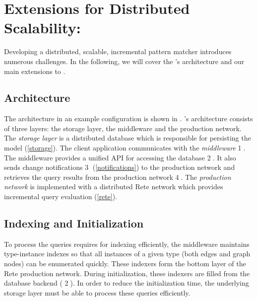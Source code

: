 

\section{Extensions for Distributed Scalability: \iqd{}}
\label{iqd-architecture}

Developing a distributed, scalable, incremental pattern matcher introduces numerous challenges. In the following, we will cover the \iqd{}'s architecture and our main extensions to \eiq{}.


\subsection{Architecture}

The \iqd{} architecture in an example configuration is shown in . \iqd{}'s architecture consists of three layers: the storage layer, the middleware and the production network. 
The \emph{storage layer} is a distributed database which is responsible for persisting the model (\autoref{storage}). 
The client application communicates with the \emph{middleware} \textcircled{1}. The middleware provides a unified API for accessing the database \textcircled{2}. It also sends change notifications \textcircled{3} (\autoref{notifications}) to the production network and retrieves the query results from the production network \textcircled{4}. 
The \emph{production network} is implemented with a distributed Rete network which provides incremental query evaluation (\autoref{rete}).

\subsection{Indexing and Initialization}
\label{indexing}

To process the queries requires for indexing efficiently, the \iqd{} middleware maintains type-instance indexes so that all instances of a given type (both edges and graph nodes) can be enumerated quickly. These indexers form the bottom layer of the Rete production network. During initialization, these indexers are filled from the database backend ( \textcircled{2}). In order to reduce the initialization time, the underlying storage layer must be able to process these queries efficiently. 

